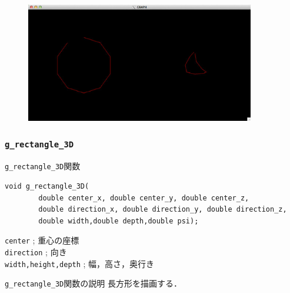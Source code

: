 \documentclass[a4paper,12pt]{jsarticle}%
\begin{document}
\begin{figure}[htb]
	\includegraphics[width=100mm]{./Figures/eps/Canvas_g_polyline.eps}
\end{figure}



\clearpage
\subsubsection{\texttt{g\_rectangle\_3D}}

\begin{itembox}[l]{\texttt{g\_rectangle\_3D}関数}
\begin{verbatim}
void g_rectangle_3D(
        double center_x, double center_y, double center_z,
        double direction_x, double direction_y, double direction_z,
        double width,double depth,double psi);
\end{verbatim}
\verb|center| ; 重心の座標\\
\verb|direction| ; 向き\\
\verb|width,height,depth| ; 幅，高さ，奥行き\\
\end{itembox}

\begin{itembox}[l]{\texttt{g\_rectangle\_3D}関数の説明}
長方形を描画する．
\end{itembox}



\clearpage
\end{document}
